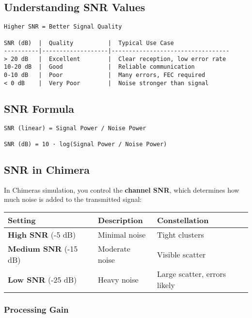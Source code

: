 \subsection{Understanding SNR Values}\label{understanding-snr-values}

\begin{verbatim}
Higher SNR = Better Signal Quality

SNR (dB)  |  Quality          |  Typical Use Case
----------|-------------------|----------------------------------
> 20 dB   |  Excellent        |  Clear reception, low error rate
10-20 dB  |  Good             |  Reliable communication
0-10 dB   |  Poor             |  Many errors, FEC required
< 0 dB    |  Very Poor        |  Noise stronger than signal
\end{verbatim}

\subsection{SNR Formula}\label{snr-formula}

\begin{verbatim}
SNR (linear) = Signal Power / Noise Power

SNR (dB) = 10 · log(Signal Power / Noise Power)
\end{verbatim}

\subsection{SNR in Chimera}\label{snr-in-chimera}

In Chimera\textquotesingle s simulation, you control the \textbf{channel
SNR}, which determines how much noise is added to the transmitted
signal:

{\def\LTcaptype{} %
\begin{longtable}[]{@{}lll@{}}
\toprule\noalign{}
Setting & Description & Constellation \\
\midrule\noalign{}
\endhead
\bottomrule\noalign{}
\endlastfoot
\textbf{High SNR} (-5 dB) & Minimal noise & Tight clusters \\
\textbf{Medium SNR} (-15 dB) & Moderate noise & Visible scatter \\
\textbf{Low SNR} (-25 dB) & Heavy noise & Large scatter, errors
likely \\
\end{longtable}
}

\subsubsection{Processing Gain}\label{processing-gain}

